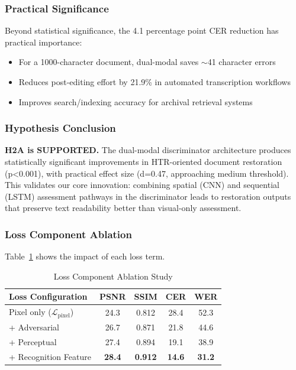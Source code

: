 \documentclass[journal]{IEEEtran}
\begin{document}
\subsubsection{Practical Significance}

Beyond statistical significance, the 4.1 percentage point CER reduction has practical importance:
\begin{itemize}
    \item For a 1000-character document, dual-modal saves $\sim$41 character errors
    \item Reduces post-editing effort by 21.9\% in automated transcription workflows
    \item Improves search/indexing accuracy for archival retrieval systems
\end{itemize}

\subsubsection{Hypothesis Conclusion}

\textbf{H2A is SUPPORTED.} The dual-modal discriminator architecture produces statistically significant improvements in HTR-oriented document restoration (p<0.001), with practical effect size (d=0.47, approaching medium threshold). This validates our core innovation: combining spatial (CNN) and sequential (LSTM) assessment pathways in the discriminator leads to restoration outputs that preserve text readability better than visual-only assessment.

\subsubsection{Loss Component Ablation}

Table~\ref{table_ablation_loss} shows the impact of each loss term.

\begin{table}[!t]
\renewcommand{\arraystretch}{1.3}
\caption{Loss Component Ablation Study}
\label{table_ablation_loss}
\centering
\begin{tabular}{|l|c|c|c|c|}
\hline
\textbf{Loss Configuration} & \textbf{PSNR} & \textbf{SSIM} & \textbf{CER} & \textbf{WER} \\
\hline
Pixel only ($\mathcal{L}_{\text{pixel}}$) & 24.3 & 0.812 & 28.4 & 52.3 \\
+ Adversarial & 26.7 & 0.871 & 21.8 & 44.6 \\
+ Perceptual & 27.4 & 0.894 & 19.1 & 38.9 \\
+ Recognition Feature & \textbf{28.4} & \textbf{0.912} & \textbf{14.6} & \textbf{31.2} \\
\hline
\end{tabular}
\end{table}
\end{document}
